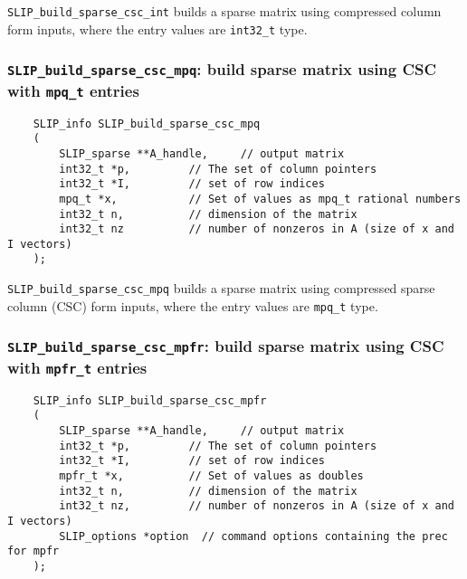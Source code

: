 \documentclass[12pt]{article}
\theoremstyle{definition}
\begin{document}
\verb|SLIP_build_sparse_csc_int| builds a sparse matrix using compressed column
form inputs, where the entry values are \verb|int32_t| type.

\cprotect\subsubsection{\verb|SLIP_build_sparse_csc_mpq|: build sparse matrix using CSC with \verb|mpq_t| entries}
\label{s:user:build_sparse_csc_mpq}

\begin{mdframed}[userdefinedwidth=6in]
{\footnotesize
\begin{verbatim}
    SLIP_info SLIP_build_sparse_csc_mpq
    (
        SLIP_sparse **A_handle,     // output matrix
        int32_t *p,         // The set of column pointers
        int32_t *I,         // set of row indices
        mpq_t *x,           // Set of values as mpq_t rational numbers
        int32_t n,          // dimension of the matrix
        int32_t nz          // number of nonzeros in A (size of x and I vectors)
    );
\end{verbatim}
} \end{mdframed}

\verb|SLIP_build_sparse_csc_mpq| builds a sparse matrix using compressed
sparse column (CSC) form inputs, where the entry values are \verb|mpq_t| type.

\cprotect\subsubsection{\verb|SLIP_build_sparse_csc_mpfr|: build sparse matrix using CSC with \verb|mpfr_t| entries}
\label{s:user:build_sparse_csc_mpfr}

\begin{mdframed}[userdefinedwidth=6in]
{\footnotesize
\begin{verbatim}
    SLIP_info SLIP_build_sparse_csc_mpfr
    (
        SLIP_sparse **A_handle,     // output matrix
        int32_t *p,         // The set of column pointers
        int32_t *I,         // set of row indices
        mpfr_t *x,          // Set of values as doubles
        int32_t n,          // dimension of the matrix
        int32_t nz,         // number of nonzeros in A (size of x and I vectors)
        SLIP_options *option  // command options containing the prec for mpfr
    );
\end{verbatim}
} \end{mdframed}
\end{document}

